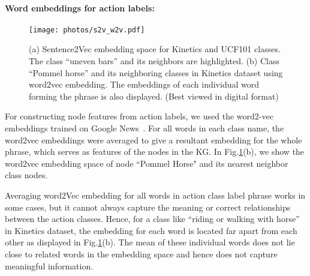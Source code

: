 \paragraph{\bf Word embeddings for action labels:}

\begin{figure}
\centering
  \texttt{[image: photos/s2v\_w2v.pdf]}
  \caption{(a) Sentence2Vec embedding space for Kinetics and UCF101 classes. The class ``uneven bars'' and its neighbors are highlighted. (b) Class ``Pommel horse'' and its neighboring classes in Kinetics dataset using word2vec embedding. The embeddings of each individual word forming the phrase is also displayed. (Best viewed in digital format)}
  \label{fig:s2v}
\end{figure}

For constructing node features from action labels, we used the word2-vec embeddings trained on Google News~\cite{mikolov2013efficient,mikolov2013distributed,mikolov2013linguistic}. For all words in each class name, the word2vec embeddings were averaged to give a resultant embedding for the whole phrase, which serves as features of the nodes in the KG. In Fig.\ref{fig:s2v}(b), we show the word2vec embedding space of node ``Pommel Horse" and its nearest neighbor class nodes.

Averaging word2Vec embedding for all words in action class label phrase works in some cases, but it cannot always capture the meaning or correct relationships between the action classes. Hence, for a class like ``riding or walking with horse'' in Kinetics dataset, the embedding for each word is located far apart from each other as displayed in Fig.\ref{fig:s2v}(b). The mean of these individual words does not lie close to related words in the embedding space and hence does not capture meaningful information.

\begin{table}
\centering
\caption{Performance comparison between word2vec embedding and sentence2vec embedding based models. Both the models are trained on graphs consisting of class nodes from Kinetics and UCF101 with losses on both. Performance metric used is mean accuracy.}
\label{table:w2v_s2v}
\end{table}

